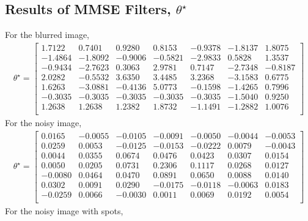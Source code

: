 \documentclass{article}
\begin{document}
\subsection{Results of MMSE Filters, $\theta^{\star}$}
	For the blurred image,
	\begin{align*}
		\theta^{\star} =
		\begin{bmatrix}
			1.7122 & 0.7401 & 0.9280 & 0.8153 & -0.9378 & -1.8137 & 1.8075 \\
		   -1.4864 & -1.8092 & -0.9006 & -0.5821& -2.9833 & 0.5828 & 1.3537 \\
		   -0.9434 & -2.7623 & 0.3063 & 2.9781 & 0.7147 & -2.7348 & -0.8187 \\
			2.0282 & -0.5532 & 3.6350 & 3.4485 & 3.2368 & -3.1583 & 0.6775 \\
			1.6263 & -3.0881 & -0.4136 & 5.0773 & -0.1598 & -1.4265 & 0.7996 \\
		   -0.3035 & −0.3035 & −0.3035 & −0.3035 & −0.3035 & −1.5040 & 0.9250 \\
			1.2638 & 1.2638 & 1.2382 & 1.8732 & −1.1491 & −1.2882 & 1.0076 \\
		\end{bmatrix}
	\end{align*}
	For the noisy image,
	\begin{align*}
		\theta^{\star} =
		\begin{bmatrix}
			0.0165 & -0.0055 & -0.0105 & -0.0091 & -0.0050 & -0.0044 & -0.0053 \\
			0.0259 &  0.0053 & -0.0125 & -0.0153 & -0.0222 &  0.0079 & -0.0043 \\
			0.0044 &  0.0355 &  0.0674 &  0.0476 &  0.0423 &  0.0307 &  0.0154 \\
			0.0050 &  0.0205 &  0.0731 &  0.2306 &  0.1117 &  0.0268 &  0.0127 \\
		   -0.0080 &  0.0464 &  0.0470 &  0.0891 &  0.0650 &  0.0088 &  0.0140 \\
			0.0302 &  0.0091 &  0.0290 & -0.0175 & -0.0118 & -0.0063 &  0.0183 \\
		   -0.0259 &  0.0066 & -0.0030 &  0.0011 &  0.0069 &  0.0192 &  0.0054 \\
		\end{bmatrix}
	\end{align*}
	For the noisy image with spots,
\end{document}
